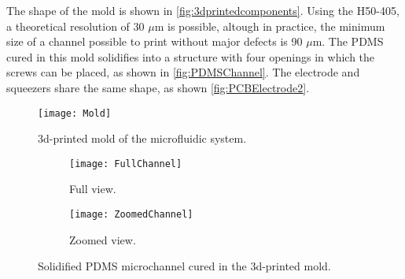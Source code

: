 The shape of the mold is shown in \autoref{fig:3dprintedcomponents}. Using the H50-405, a theoretical resolution of 30 $\mu$m is possible, altough in practice, the minimum size of a channel possible to print without major defects is 90 $\mu$m. The PDMS cured in this mold solidifies into a structure with four openings in which the screws can be placed, as shown in \autoref{fig:PDMSChannel}. The electrode and squeezers share the same shape, as shown \autoref{fig:PCBElectrode2}.
\begin{figure}[h]
\centering
    \texttt{[image: Mold]}
\caption{3d-printed mold of the microfluidic system.}
\label{fig:3dprintedcomponents}
\end{figure}

\begin{figure}[h]
\centering
\begin{subfigure}{0.49\textwidth}
\centering
    \texttt{[image: FullChannel]}
    \caption{Full view.}
    \label{fig:FullChannel}
\end{subfigure}
\begin{subfigure}{0.49\textwidth}
\centering
    \texttt{[image: ZoomedChannel]}
    \caption{Zoomed view.}
    \label{fig:ZoomedChannel}
\end{subfigure}
\caption{Solidified PDMS microchannel cured in the 3d-printed mold.}
\label{fig:PDMSChannel}
\end{figure}


